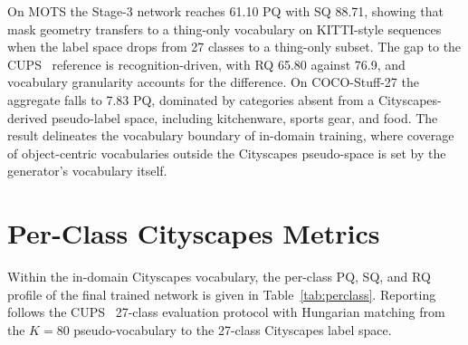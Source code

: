 \documentclass{article}
\begin{document}
On MOTS the Stage-3 network reaches 61.10 PQ with SQ 88.71, showing that mask geometry transfers to a thing-only vocabulary on KITTI-style sequences when the label space drops from 27 classes to a thing-only subset. The gap to the CUPS~\cite{hahn2025cups} reference is recognition-driven, with RQ 65.80 against 76.9, and vocabulary granularity accounts for the difference. On COCO-Stuff-27 the aggregate falls to 7.83 PQ, dominated by categories absent from a Cityscapes-derived pseudo-label space, including kitchenware, sports gear, and food. The result delineates the vocabulary boundary of in-domain training, where coverage of object-centric vocabularies outside the Cityscapes pseudo-space is set by the generator's vocabulary itself.

\section{Per-Class Cityscapes Metrics}
\label{sec:supp:perclass}

Within the in-domain Cityscapes vocabulary, the per-class PQ, SQ, and RQ profile of the final trained network is given in Table~\ref{tab:perclass}. Reporting follows the CUPS~\cite{hahn2025cups} 27-class evaluation protocol with Hungarian matching from the $K{=}80$ pseudo-vocabulary to the 27-class Cityscapes label space.

\begin{table}[!htbp]
\caption{Per-class Cityscapes validation PQ, SQ, and RQ for the final trained network. Values are percentages.}
\label{tab:perclass}
\centering
\small
\setlength{\tabcolsep}{6pt}
\end{table}
\end{document}
